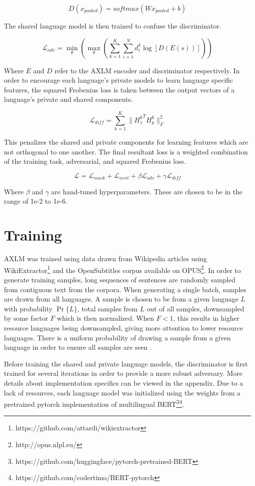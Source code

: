 \documentclass[12pt,letterpaper,twocolumn]{article}
\begin{document}
$$D(x_{pooled}) = softmax(W x_{pooled} + b)$$

The shared language model is then trained to confuse the discriminator.

$$\mathcal{L}_{adv} = \min_\theta \left( \max_\theta ( \sum_{k=1}^K \sum_{i=1}^N d_i^k \log [D(E(s))] ) \right)$$

Where $E$ and $D$ refer to the AXLM encoder and discriminator respectively.  In order to encourage each language's private models to learn language specific features, the squared Frobenius loss is taken between the output vectors of a language's private and shared components.

$$\mathcal{L}_{diff} = \sum_{k=1}^K \lVert {H_s^k}^T H_p^k \rVert_F^2$$

This penalizes the shared and private components for learning features which are not orthogonal to one another.  The final resultant loss is a weighted combination of the training task, adversarial, and squared Frobenius loss.

$$\mathcal{L} = \mathcal{L}_{mask} + \mathcal{L}_{next} + \beta \mathcal{L}_{adv} + \gamma \mathcal{L}_{diff}$$

Where $\beta$ and $\gamma$ are hand-tuned hyperparameters.  These are chosen to be in the range of 1e-2 to 1e-6.

\section{Training}
AXLM was trained using data drawn from Wikipedia articles using WikiExtractor\footnote{https://github.com/attardi/wikiextractor} and the OpenSubtitles corpus available on OPUS\footnote{http://opus.nlpl.eu/}.  In order to generate training samples, long sequences of sentences are randomly sampled from contiguous text from the corpora.  When generating a single batch, samples are drawn from all languages.  A sample is chosen to be from a given language $L$ with probability $\Pr\{L\}$, total samples from $L$ out of all samples, downsampled by some factor $F$ which is then normalized.  When $F < 1$, this results in higher resource languages being downsampled, giving more attention to lower resource languages.  There is a uniform probability of drawing a sample from a given language in order to ensure all samples are seen \cite{}.

Before training the shared and private language models, the discriminator is first trained for several iterations in order to provide a more robust adversary.  More details about implementation specifics can be viewed in the appendix.  Due to a lack of resources, each language model was initialized using the weights from a pretrained pytorch implementation of multilingual BERT\footnote{https://github.com/huggingface/pytorch-pretrained-BERT}\footnote{https://github.com/codertimo/BERT-pytorch}.
\end{document}
